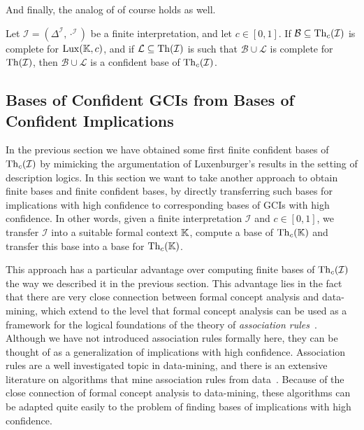 And finally, the analog of  of course holds as well.

\begin{Corollary}
  \label{cor:weakened-luxenburger-base-for-gcis}
  Let $\mathcal{I} = (\Delta^{\mathcal{I}}, \cdot^{\mathcal{I}})$ be a finite
  interpretation, and let $c \in [0,1]$.  If $\mathcal{B} \subseteq \operatorname{Th}_c(\mathcal{I})$ is
  complete for $\operatorname{Lux}({\mathbb{K}}, c)$, and if $\mathcal{L} \subseteq \operatorname{Th}(\mathcal{I})$ is such
  that $\mathcal{B} \cup \mathcal{L}$ is complete for $\operatorname{Th}(\mathcal{I})$, then
  $\mathcal{B} \cup \mathcal{L}$ is a confident base of $\operatorname{Th}_c(\mathcal{I})$.
\end{Corollary}

\subsection{Bases of Confident GCIs from Bases of Confident Implications}
\label{sec:bases-confident-gcis}

In the previous section we have obtained some first finite confident bases of
$\operatorname{Th}_c(\mathcal{I})$ by mimicking the argumentation of Luxenburger's results in the
setting of description logics.  In this section we want to take another approach to obtain
finite bases and finite confident bases, by directly transferring such bases for
implications with high confidence to corresponding bases of GCIs with high confidence.  In
other words, given a finite interpretation $\mathcal{I}$ and $c \in [0,1]$, we transfer
$\mathcal{I}$ into a suitable formal context ${\mathbb{K}}$, compute a base of $\operatorname{Th}_c({\mathbb{K}})$
and transfer this base into a base for $\operatorname{Th}_c({\mathbb{K}})$.

This approach has a particular advantage over computing finite bases of
$\operatorname{Th}_c(\mathcal{I})$ the way we described it in the previous section.  This advantage lies
in the fact that there are very close connection between formal concept analysis and
data-mining, which extend to the level that formal concept analysis can be used as a
framework for the logical foundations of the theory of \emph{association
  rules}~\cite{arules:Zaki:1998}.  Although we have not introduced association rules
formally here, they can be thought of as a generalization of implications with high
confidence.  Association rules are a well investigated topic in data-mining, and there is
an extensive literature on algorithms that mine association rules from data~.  Because of the close connection of formal concept analysis to
data-mining, these algorithms can be adapted quite easily to the problem of finding bases
of implications with high confidence.

